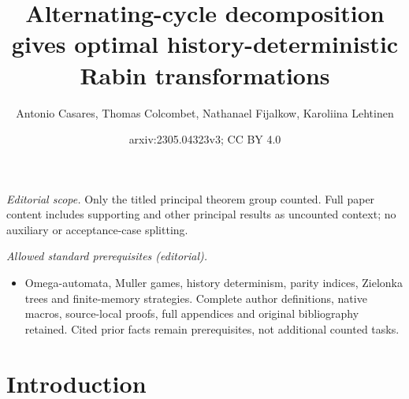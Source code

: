 \documentclass[10pt,a4paper]{amsart}
\title{Alternating-cycle decomposition gives optimal history-deterministic Rabin transformations}
\author{Antonio Casares, Thomas Colcombet, Nathanael Fijalkow, Karoliina Lehtinen}
\date{arxiv:2305.04323v3; CC BY 4.0}
\begin{document}
\maketitle
\noindent\textit{Editorial scope.} Only the titled principal theorem group counted. Full paper content includes supporting and other principal results as uncounted context; no auxiliary or acceptance-case splitting.\par\medskip
\noindent\textit{Allowed standard prerequisites (editorial).}\begin{itemize}
\item Omega-automata, Muller games, history determinism, parity indices, Zielonka trees and finite-memory strategies. Complete author definitions, native macros, source-local proofs, full appendices and original bibliography retained. Cited prior facts remain prerequisites, not additional counted tasks.
\end{itemize}\medskip
	\section{Introduction}\label{section:introduction}
\end{document}
